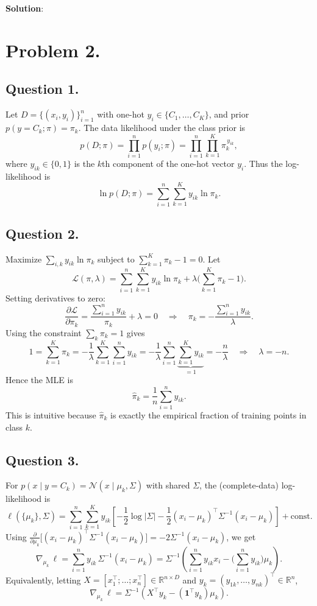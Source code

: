 \documentclass[submit]{../harvardml}
\newenvironment{solution}{
    \vspace{2mm}
    \color{blue}\noindent\textbf{Solution}:
}{}
\begin{document}
\begin{solution}

\section{Problem 2.}

\subsection{Question 1.}

Let $D=\{(x_i,y_i)\}_{i=1}^n$ with one-hot $y_i\in\{C_1,\dots,C_K\}$, and prior $p(y=C_k;\pi)=\pi_k$. The data likelihood under the class prior is
\[
p(D;\pi)=\prod_{i=1}^n p(y_i;\pi)
=\prod_{i=1}^n \prod_{k=1}^K \pi_k^{\,y_{ik}},
\]
where $y_{ik}\in\{0,1\}$ is the $k$th component of the one-hot vector $y_i$.
Thus the log-likelihood is
\[
\ln p(D;\pi)=\sum_{i=1}^n\sum_{k=1}^K y_{ik}\ln \pi_k.
\]
\subsection{Question 2.}

Maximize $\sum_{i,k} y_{ik}\ln\pi_k$ subject to $\sum_{k=1}^K \pi_k-1=0$.
Let
\[
\mathcal{L}(\pi,\lambda)=\sum_{i=1}^n\sum_{k=1}^K y_{ik}\ln \pi_k+\lambda\Big(\sum_{k=1}^K \pi_k-1\Big).
\]
Setting derivatives to zero:
\[
\frac{\partial \mathcal{L}}{\partial \pi_k}=\frac{\sum_{i=1}^n y_{ik}}{\pi_k}+\lambda=0
\quad\Longrightarrow\quad
\pi_k=-\frac{\sum_{i=1}^n y_{ik}}{\lambda}.
\]
Using the constraint $\sum_k \pi_k=1$ gives
\[
1=\sum_{k=1}^K \pi_k=-\frac{1}{\lambda}\sum_{k=1}^K\sum_{i=1}^n y_{ik}
=-\frac{1}{\lambda}\sum_{i=1}^n \underbrace{\sum_{k=1}^K y_{ik}}_{=1}
=-\frac{n}{\lambda}
\quad\Longrightarrow\quad \lambda=-n.
\]
Hence the MLE is
\[
\hat\pi_k=\frac{1}{n}\sum_{i=1}^n y_{ik}.
\]
This is intuitive because $\hat\pi_k$ is exactly the empirical fraction of training points in class $k$.

\subsection{Question 3.}

For $p(x\mid y=C_k)=\mathcal{N}(x\mid \mu_k,\Sigma)$ with shared $\Sigma$, the (complete-data) log-likelihood is
\[
\ell(\{\mu_k\},\Sigma)=\sum_{i=1}^n\sum_{k=1}^K y_{ik}\left[-\frac12\log|\Sigma|-\frac12(x_i-\mu_k)^\top\Sigma^{-1}(x_i-\mu_k)\right]+ \text{const}.
\]
Using $\frac{\partial}{\partial \mu_k}\big[(x_i-\mu_k)^\top\Sigma^{-1}(x_i-\mu_k)\big]
=-2\Sigma^{-1}(x_i-\mu_k)$, we get
\[
\nabla_{\mu_k}\,\ell
=\sum_{i=1}^n y_{ik}\,\Sigma^{-1}(x_i-\mu_k)
=\Sigma^{-1}\!\left(\sum_{i=1}^n y_{ik}x_i-\Big(\sum_{i=1}^n y_{ik}\Big)\mu_k\right).
\]
Equivalently, letting $X=[x_1^\top;\dots;x_n^\top]\in\mathbb{R}^{n\times D}$ and $y_k=(y_{1k},\dots,y_{nk})^\top\in\mathbb{R}^n$,
\[
\nabla_{\mu_k}\,\ell=\Sigma^{-1}\!\left(X^\top y_k-(\mathbf{1}^\top y_k)\mu_k\right).
\]

\end{solution}
\end{document}
